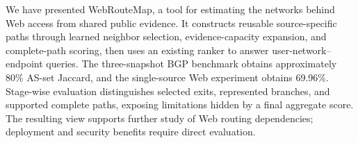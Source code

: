\documentclass[sigconf,anonymous,review]{acmart}
\newcommand{\sys}{\mbox{WebRouteMap}\xspace}
\begin{document}
We have presented \sys, a tool for estimating the networks behind Web access
from shared public evidence. It constructs reusable source-specific paths
through learned neighbor selection, evidence-capacity expansion, and
complete-path scoring, then uses an existing ranker to answer
user-network--endpoint queries. The three-snapshot BGP benchmark obtains approximately 80\% AS-set Jaccard, and the single-source
Web experiment obtains 69.96\%.
Stage-wise evaluation distinguishes selected exits, represented branches,
and supported complete paths, exposing limitations hidden by a final
aggregate score. The resulting view supports further study of Web routing
dependencies; deployment and security benefits require direct evaluation.

\clearpage
\balance


\end{document}
